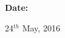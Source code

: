 \documentclass[a4paper]{article}
\begin{document}
\begin{flushleft}

				\begin{Large}\vspace{0.1in}\textbf{Date:}\end{Large}
				\hspace{0.68in}24$^{th}$ May, 2016
				
			  
		

				
				


			


    	
  	
 	
 	
 	
 \end{flushleft}

	

	
\end{document}
